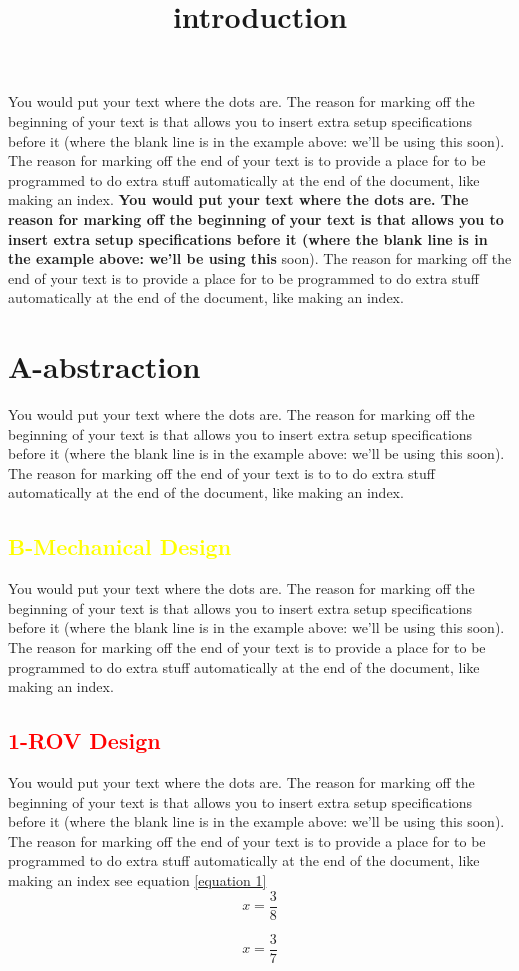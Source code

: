 \documentclass[a4paper,12pt,leqno]{report}
\title{introduction}
\begin{document}
\maketitle	
	You would put your text where the dots are. The reason for marking off the beginning of your text is that  allows you to insert extra setup specifications before it (where the blank line is in the example above: we'll be using this soon). The reason for marking off the end of your text is to provide a place for to be programmed to do extra stuff automatically at the end of the document, like making an index.	
\textbf{You would put your text where the dots are. The reason for marking off the beginning of your text is that  allows you to insert extra setup specifications before it (where the blank line is in the example above: we'll be using this }soon). The reason for marking off the end of your text is to provide a place for to be programmed to do extra stuff automatically at the end of the document, like making an index.
\section*{A-abstraction}
\begin{mdframed}
You would put your text where the dots are. The reason for marking off the beginning of your text is that allows you to insert extra setup specifications before it (where the blank line is in the example above: we'll be using this soon). The reason for marking off the end of your text is to \linebreak to do extra stuff automatically at the end of the document, \linebreak like making an index.
\end{mdframed}
\textcolor{yellow}{
\section*{B-Mechanical Design}}
You would put your text where the dots are. The reason for marking off the beginning of your text is that  allows you to insert extra setup specifications before it (where the blank line is in the example above: we'll be using this soon). The reason for marking off the end of your text is to provide a place for to be programmed to do extra stuff automatically
 at the end of the document, like making an index.
\textcolor{red}{
\subsection*{1-ROV Design}}
You would put your text where the dots are. The reason for marking off the beginning of your text is that  allows you to insert extra setup specifications before it (where the blank line is in the example above: we'll be using this soon). The reason for marking off the end of your text is to provide a place for to be programmed to do extra stuff automatically at the end of the document, like making an index see equation \ref{equation 1}
\begin{equation}
	x=\frac{3}{8}
\end{equation}

\begin{equation}\label{equation 1}
x=\frac{3}{7}
\end{equation}
\end{document}
